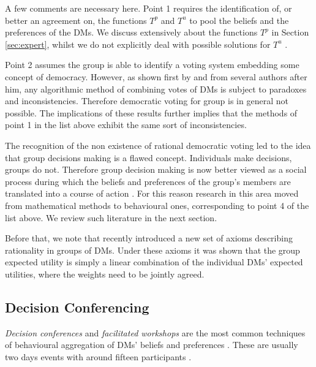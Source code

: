 A few comments are necessary here. Point 1 requires the identification of, or better an agreement on, the functions $T^p$ and $T^u$ to pool the beliefs and the preferences of the \glspl{DM}. We discuss extensively about the functions $T^p$ in Section \ref{sec:expert}, whilst we do not explicitly deal with possible solutions for $T^u$ \citep[see for more details ][]{Keeney1976, Keeney1993a, Keeney2013}.  

Point 2 assumes the group is able to identify a voting system embedding some concept of democracy. However, as shown first by \citet{Arrow1963} and from several authors after him, any algorithmic method of combining votes of \glspl{DM} is subject to paradoxes and inconsistencies. Therefore democratic voting for group is in general not possible. The implications of these results further implies that the methods of point 1 in the list above exhibit the same sort of inconsistencies.

The recognition of the non existence of rational democratic voting led to the idea that group decisions making is a flawed concept. Individuals make decisions, groups do not. Therefore group decision making is now better viewed as a social process during which the beliefs and preferences of the group's members are translated into a course of action \citep{French2009}. For this reason research in this area moved from mathematical methods to behavioural ones, corresponding to point 4 of the list above. We review such literature in the next section.

Before that, we note that recently \citet{Keeney2013} introduced a new set of axioms describing rationality in groups of \glspl{DM}. Under these axioms it was shown that the group expected utility is simply a linear combination of the individual \glspl{DM}' expected utilities, where the weights need to be jointly agreed.    

\subsection{Decision Conferencing}
\label{sec:decconf}
\textit{Decision conferences} and \textit{facilitated workshops} are the most common techniques of behavioural aggregation of \glspl{DM}' beliefs and preferences \citep{ Ackermann1996,Phillips1984,Phillips1993}. These are usually two days events with around fifteen participants \citep[although for example in the Chernobyl project we discussed in Chapter \ref{chapter1} the number of participants was way larger as noted in][]{French2009}.

